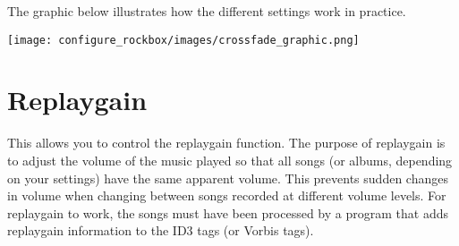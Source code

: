 {{      

          The graphic below illustrates how the different settings work in practice.

         \texttt{[image: configure\_rockbox/images/crossfade\_graphic.png]}
    }%
    
  \section{\label{ref:ReplayGain}Replaygain}
    This allows you to control the replaygain function.
    The purpose of replaygain is to adjust the volume of the music played
    so that all songs (or albums, depending on your settings) have the
    same apparent volume. This prevents sudden changes in volume when
    changing between songs recorded at different volume levels.
    For replaygain to work, the songs must have been processed by a program
    that adds replaygain information to the ID3 tags (or Vorbis tags).\\
      
}
